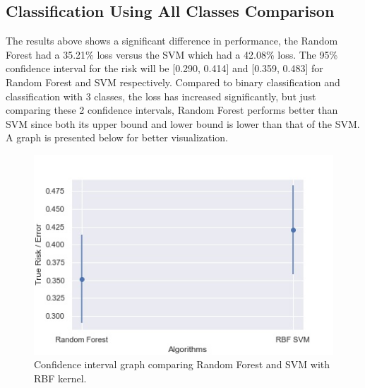 \documentclass[11pt,a4paper,titlepage]{article}
\begin{document}
	\subsection{Classification Using All Classes Comparison}
	The results above shows a significant difference in performance, the Random Forest had a 35.21\% loss versus the SVM which had a 42.08\% loss. The 95\% confidence interval for the risk will be [0.290, 0.414] and [0.359, 0.483] for Random Forest and SVM respectively. Compared to binary classification and classification with 3 classes, the loss has increased significantly, but just comparing these 2 confidence intervals, Random Forest performs better than SVM since both its upper bound and lower bound is lower than that of the SVM. A graph is presented below for better visualization. 
	\begin{figure}[H]
		\centering
		\includegraphics[scale=0.6]{img/allclasses_errorgraph1.jpg}
		\caption{ Confidence interval graph comparing Random Forest and SVM with RBF kernel.}
	\end{figure}
	
\end{document}
